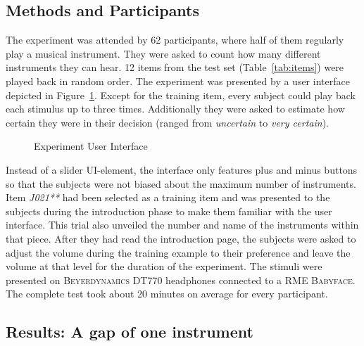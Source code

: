 \subsection{Methods and Participants}
The experiment was attended by 62 participants, where half of them regularly play a musical instrument. They were asked to count how many different instruments they can hear. 12 items from the test set (Table~\ref{tab:items}) were played back in random order. The experiment was presented by a user interface depicted in Figure~\ref{fig:experiment_ui}. Except for the training item, every subject could play back each stimulus up to three times. Additionally they were asked to estimate how certain they were in their decision (ranged from \emph{uncertain} to \emph{very certain}).
\begin{figure}[h]
    \centering
    \caption{Experiment User Interface}
    \label{fig:experiment_ui}
\end{figure}
Instead of a slider UI-element, the interface only features plus and minus buttons so that the subjects were not biased about the maximum number of instruments. Item \emph{J021**} had been selected as a training item and was presented to the subjects during the introduction phase to make them familiar with the user interface. This trial also unveiled the number and name of the instruments within that piece. After they had read the introduction page, the subjects were asked to adjust the volume during the training example to their preference and leave the volume at that level for the duration of the experiment. The stimuli were presented on \textsc{Beyerdynamics DT770} headphones connected to a \textsc{RME Babyface}. The complete test took about 20 minutes on average for every participant.

\subsection{Results: A gap of one instrument}


